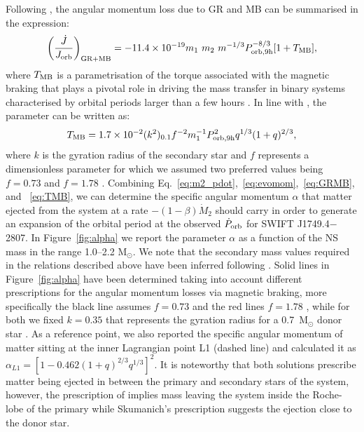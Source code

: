 \documentclass[fleqn,usenatbib]{mnras}
\newcommand{\swiftj}{SWIFT J1749.4$-$2807}
\begin{document}
Following \citet{Burderi:2010tk}, the angular momentum loss due to GR and MB can be summarised in the expression:
\begin{equation} 
\label{eq:GRMB}
\left(\frac{\dot{J}}{J_{\rm orb}}\right)_{\rm GR+MB}=-11.4\times 10^{-19}m_1~m_{2}~m^{-1/3}P_{\rm orb,9h}^{-8/3}[1+T_{\rm MB}],
\end{equation}
where $T_{\rm MB}$ is a parametrisation of the torque associated with the magnetic braking that plays a pivotal role in driving the mass transfer in binary systems characterised by orbital periods larger than a few hours \citep{Verbunt:1993vj}. In line with \citet[][]{Iaria:2018tq}, the parameter can be written as:
\begin{equation}
\label{eq:TMB}	
T_{\rm MB}=1.7\times 10^{-2}(k^2)_{0.1}f^{-2}m_1^{-1}P_{\rm orb,9h}^2q^{1/3}(1+q)^{2/3},
\end{equation}
where $k$ is the gyration radius of the secondary star and $f$ represents a dimensionless parameter for which we assumed two preferred values being $f=0.73$ \citep{Skumanich:1972vy} and $f=1.78$ \citep{Smith:1979vn}.
Combining Eq.~\ref{eq:m2_pdot},~\ref{eq:evomom},~\ref{eq:GRMB}, and ~\ref{eq:TMB}, we can determine the specific angular momentum $\alpha$ that matter ejected from the system at a rate $-(1-\beta)\dot{M}_2$ should carry in order to generate an expansion of the orbital period at the observed $\dot{P}_{\rm orb}$ for \swiftj{}. In Figure~\ref{fig:alpha} we report the parameter $\alpha$ as a function of the NS mass in the range 1.0--2.2 M$_\odot$. We note that the secondary mass values required in the relations described above have been inferred following \citet{Markwardt:2010tl}. Solid lines in Figure~\ref{fig:alpha} have been determined taking into account different prescriptions for the angular momentum losses via magnetic braking, more specifically the black line assumes $f=0.73$ \citep{Skumanich:1972vy} and the red lines $f=1.78$ \citep{Smith:1979vn}, while for both we fixed $k=0.35$ that represents the gyration radius for a 0.7~M$_\odot$ donor star \citep[see e.g.,][]{Claret:1990to}. As a reference point, we also reported the specific angular momentum of matter sitting at the inner Lagrangian point L1 (dashed line) and calculated it as $\alpha_{L1}=[1 -0.462(1 + q)^{2/3}q^{1/3}]^2$. It is noteworthy that both solutions prescribe matter being ejected in between the primary and secondary stars of the system, however, the prescription of \citet{Smith:1979vn} implies mass leaving the system inside the Roche-lobe of the primary while Skumanich's prescription suggests the ejection close to the donor star. 
\end{document}
